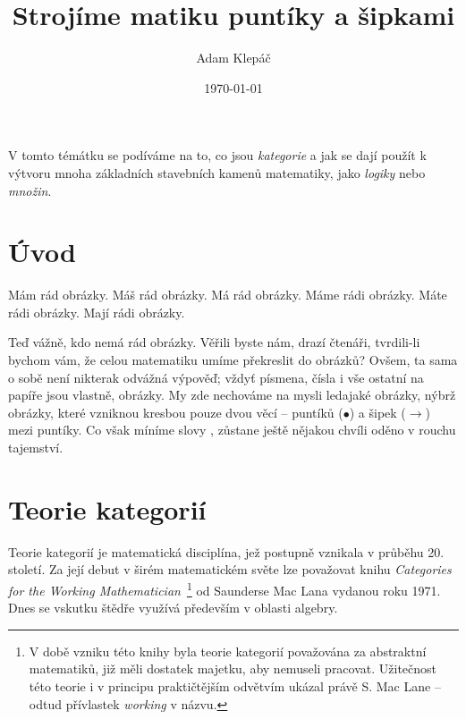 \documentclass[letterpaper,11pt,leqno]{article}
\begin{document}
\title{Strojíme matiku puntíky a šipkami}

\author{Adam Klepáč}

\date{\today}   


\begin{titlepage}
\maketitle

V tomto témátku se podíváme na to, co jsou \emph{kategorie} a jak se dají použít
k výtvoru mnoha základních stavebních kamenů matematiky, jako \emph{logiky} nebo
\emph{množin}.

\end{titlepage}

\section*{Úvod}
\label{sec:uvod}

Mám rád obrázky. Máš rád obrázky. Má rád obrázky. Máme rádi obrázky. Máte rádi
obrázky. Mají rádi obrázky.

Teď vážně, kdo nemá rád obrázky. Věřili byste nám, drazí čtenáři, tvrdili-li
bychom vám, že celou matematiku umíme překreslit do obrázků? Ovšem, ta sama o
sobě není nikterak odvážná výpověď; vždyť písmena, čísla i vše ostatní na papíře
jsou vlastně, obrázky. My zde nechováme na mysli ledajaké obrázky, nýbrž
obrázky, které vzniknou kresbou pouze dvou věcí -- puntíků ($\bullet$) a šipek
($\longrightarrow$) mezi puntíky. Co však míníme slovy , zůstane ještě nějakou chvíli oděno v rouchu tajemství.

\section{Teorie kategorií}
\label{sec:teorie-kategorii}

Teorie kategorií je matematická disciplína, jež postupně vznikala v průběhu 20.
století. Za její debut v širém matematickém světe lze považovat knihu
\emph{Categories for the Working Mathematician}~\footnote{V době vzniku této
 knihy byla teorie kategorií považována za abstraktní  matematiků,
 již měli dostatek majetku, aby nemuseli pracovat. Užitečnost této teorie i v
principu praktičtějším odvětvím ukázal právě S. Mac Lane -- odtud přívlastek
\emph{working} v názvu.} od Saunderse Mac Lana vydanou roku 1971. Dnes se
vskutku štědře využívá především v oblasti algebry.
\end{document}
